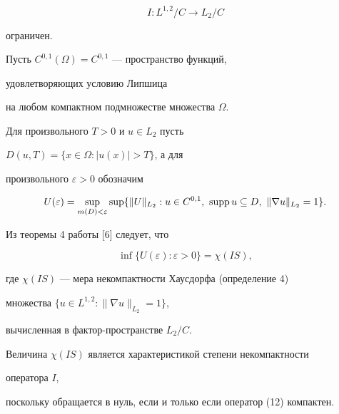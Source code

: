 \begin{equation} 


I:L^{1,2}/C\to L_2/C 


\end{equation} 


ограничен. 


Пусть $C^{0,1}(\Omega)=C^{0,1}$ --- пространство функций, 


удовлетворяющих условию Липшица  


на любом компактном подмножестве множества $\Omega$. 


Для произвольного $T>0$ и $u\in L_2$ пусть 


$D(u,T)=\{x\in\Omega:|u(x)|>T\}$, а для  


произвольного $\varepsilon>0$ обозначим 


\begin{equation} 


U(\varepsilon)=\sup_{m(D)<\varepsilon}\sup 


\{\|U\|_{L_2}:u\in C^{0,1},\ \supp 


u\subseteq D,\ \|\nabla u\|_{L_2}=1\}. 


\end{equation} 


 


Из теоремы 4 работы [6] следует, что 


$$ 


\inf\{U(\varepsilon):\varepsilon>0\}=\chi(IS), 


$$ 


где $\chi(IS)$ --- мера некомпактности Хаусдорфа (определение 4) 


множества $\{u\in L^{1,2}:\|\nabla u\|_{L_2}=1\}$, 


вычисленная в фактор-пространстве $L_2/C$. 


Величина $\chi(IS)$ является характеристикой степени некомпактности 


оператора $I$, 


поскольку обращается в нуль, если и только если оператор (12) компактен.  


 


